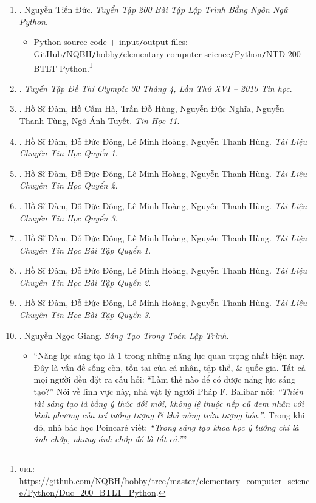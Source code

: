 \documentclass{article}
\begin{document}
\begin{enumerate}
	\item \cite{Duc_200_BT_Python}. Nguyễn Tiến Đức. {\it Tuyển Tập 200 Bài Tập Lập Trình Bằng Ngôn Ngữ Python}.\hfill{\sf[reading]}
	\begin{itemize}
		\item Python source code $+$ input{\tt/}output files:\\\href{https://github.com/NQBH/hobby/tree/master/elementary_computer_science/Python/Duc_200_BTLT_Python}{GitHub{\tt/}NQBH{\tt/}hobby{\tt/}elementary computer science{\tt/}Python{\tt/}NTD 200 BTLT Python}.\footnote{\textsc{url}: \url{https://github.com/NQBH/hobby/tree/master/elementary_computer_science/Python/Duc_200_BTLT_Python}.}
	\end{itemize}
	\item \cite{Olympic30-4_2010_Tin_Hoc}. {\it Tuyển Tập Đề Thi Olympic 30 Tháng 4, Lần Thứ XVI -- 2010 Tin học}.\hfill{\sf[reading]}
	\item \cite{SGK_Tin_Hoc_11}. Hồ Sĩ Đàm, Hồ Cẩm Hà, Trần Đỗ Hùng, Nguyễn Đức Nghĩa, Nguyễn Thanh Tùng, Ngô Ánh Tuyết. {\it Tin Học 11}.\\\mbox{}\hfill{\sf[done]}
	\item \cite{TL_chuyen_Tin_quyen_1}. Hồ Sĩ Đàm, Đỗ Đức Đông, Lê Minh Hoàng, Nguyễn Thanh Hùng. {\it Tài Liệu Chuyên Tin Học Quyển 1}.\hfill{\sf[reading]}
	\item \cite{TL_chuyen_Tin_quyen_2}. Hồ Sĩ Đàm, Đỗ Đức Đông, Lê Minh Hoàng, Nguyễn Thanh Hùng. {\it Tài Liệu Chuyên Tin Học Quyển 2}.\hfill{\sf[reading]}
	\item \cite{TL_chuyen_Tin_quyen_3}. Hồ Sĩ Đàm, Đỗ Đức Đông, Lê Minh Hoàng, Nguyễn Thanh Hùng. {\it Tài Liệu Chuyên Tin Học Quyển 3}.\hfill{\sf[reading]}
	\item \cite{TL_chuyen_Tin_BT_quyen_1}. Hồ Sĩ Đàm, Đỗ Đức Đông, Lê Minh Hoàng, Nguyễn Thanh Hùng. {\it Tài Liệu Chuyên Tin Học Bài Tập Quyển 1}.
	\item \cite{TL_chuyen_Tin_BT_quyen_2}. Hồ Sĩ Đàm, Đỗ Đức Đông, Lê Minh Hoàng, Nguyễn Thanh Hùng. {\it Tài Liệu Chuyên Tin Học Bài Tập Quyển 2}.
	\item \cite{TL_chuyen_Tin_BT_quyen_3}. Hồ Sĩ Đàm, Đỗ Đức Đông, Lê Minh Hoàng, Nguyễn Thanh Hùng. {\it Tài Liệu Chuyên Tin Học Bài Tập Quyển 3}.
	\item \cite{Giang_sang_tao_lap_trinh}. {\sc Nguyễn Ngọc Giang}. {\it Sáng Tạo Trong Toán Lập Trình}.
	\begin{itemize}
		\item ``Năng lực sáng tạo là 1 trong những năng lực quan trọng nhất hiện nay. Đây là vấn đề sống còn, tồn tại của cá nhân, tập thể, \& quốc gia. Tất cả mọi người đều đặt ra câu hỏi: ``Làm thế nào để có được năng lực sáng tạo?'' Nói về lĩnh vực này, nhà vật lý người Pháp F. Balibar nói: {\it``Thiên tài sáng tạo là bằng ý thức đổi mới, không lệ thuộc nếp cũ đem nhân với bình phương của trí tưởng tượng \& khả năng trừu tượng hóa.''}. Trong khi đó, nhà bác học Poincar\'e viết: {\it``Trong sáng tạo khoa học ý tưởng chỉ là ánh chớp, nhưng ánh chớp đó là tất cả.''}'' -- \cite[Lời nói đầu]{Giang_sang_tao_lap_trinh}

\end{itemize}
\end{enumerate}
\end{document}

